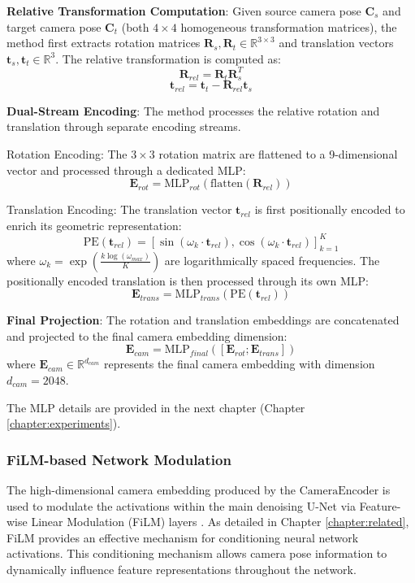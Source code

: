 \textbf{Relative Transformation Computation}: Given source camera pose $\mathbf{C}_s$ and target camera pose $\mathbf{C}_t$ (both $4 \times 4$ homogeneous transformation matrices), the method first extracts rotation matrices $\mathbf{R}_s, \mathbf{R}_t \in \mathbb{R}^{3 \times 3}$ and translation vectors $\mathbf{t}_s, \mathbf{t}_t \in \mathbb{R}^3$. The relative transformation is computed as:
\[ \mathbf{R}_{rel} = \mathbf{R}_t \mathbf{R}_s^T \]
\[ \mathbf{t}_{rel} = \mathbf{t}_t - \mathbf{R}_{rel} \mathbf{t}_s \]

\textbf{Dual-Stream Encoding}: The method processes the relative rotation and translation through separate encoding streams.

Rotation Encoding: The $3 \times 3$ rotation matrix are flattened to a 9-dimensional vector and processed through a dedicated MLP:
\[ \mathbf{E}_{rot} = \text{MLP}_{rot}(\text{flatten}(\mathbf{R}_{rel})) \]

Translation Encoding: The translation vector $\mathbf{t}_{rel}$ is first positionally encoded to enrich its geometric representation:
\[ \text{PE}(\mathbf{t}_{rel}) = [\sin(\omega_k \cdot \mathbf{t}_{rel}), \cos(\omega_k \cdot \mathbf{t}_{rel})]_{k=1}^{K} \]
where $\omega_k = \exp(\frac{k \log(\omega_{max})}{K})$ are logarithmically spaced frequencies. The positionally encoded translation is then processed through its own MLP:
\[ \mathbf{E}_{trans} = \text{MLP}_{trans}(\text{PE}(\mathbf{t}_{rel})) \]

\textbf{Final Projection}: The rotation and translation embeddings are concatenated and projected to the final camera embedding dimension:
\[ \mathbf{E}_{cam} = \text{MLP}_{final}([\mathbf{E}_{rot}; \mathbf{E}_{trans}]) \]
where $\mathbf{E}_{cam} \in \mathbb{R}^{d_{cam}}$ represents the final camera embedding with dimension $d_{cam} = 2048$.

The MLP details are provided in the next chapter (Chapter \ref{chapter:experiments}).

\subsubsection{FiLM-based Network Modulation}
The high-dimensional camera embedding produced by the $\text{CameraEncoder}$ is used to modulate the activations within the main denoising U-Net via Feature-wise Linear Modulation (FiLM) layers \cite{film}. As detailed in Chapter \ref{chapter:related}, FiLM provides an effective mechanism for conditioning neural network activations. This conditioning mechanism allows camera pose information to dynamically influence feature representations throughout the network.

